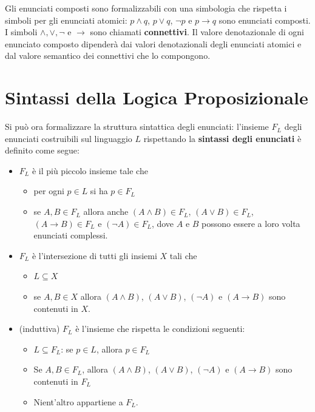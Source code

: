 Gli enunciati composti sono formalizzabili con una simbologia che rispetta 
i simboli per gli enunciati atomici: $p \land q$, $p \lor q$, $\neg p$ e 
$p \rightarrow q$ sono enunciati composti. I simboli $\land, \lor, \neg$ 
e $\rightarrow$ sono chiamati \textbf{connettivi}. Il valore denotazionale 
di ogni enunciato composto dipenderà dai 
valori denotazionali degli enunciati atomici e dal valore semantico dei connettivi 
che lo compongono. 

\section{Sintassi della Logica Proposizionale}
Si può ora formalizzare la struttura sintattica degli enunciati: 
l'insieme $F_{L}$ degli enunciati costruibili 
sul linguaggio $L$ rispettando la \textbf{sintassi 
degli enunciati} è definito come segue: 
\begin{itemize}
  \setlength\itemsep{0pt}
 \item $F_L$ è il più piccolo insieme tale che 
    \begin{itemize}
      \item per ogni $p \in L$ si ha $p \in F_L$
      \item se $A,B \in F_L$ allora anche $(A\land B) \in F_L$, $(A\lor B) \in F_L$, 
        $(A \rightarrow B) \in F_L$ e $(\neg A) \in F_L$, dove $A$ e $B$ possono 
        essere a loro volta enunciati complessi. 
      \end{itemize}
  \item $F_L$ è l'intersezione di tutti gli insiemi $X$ tali che 
    \begin{itemize}
      \item $L \subseteq X$
      \item se $A,B \in X$ allora $(A\land B)$, $(A\lor B)$, $(\neg A)$ e 
        $(A \rightarrow B)$ sono contenuti in $X$. 
    \end{itemize}
  \item (induttiva) $F_L$ è l'insieme che rispetta le condizioni seguenti: 
    \begin{itemize}
      \item $L \subseteq F_L$: se $p \in L$, allora $p \in F_L$
      \item Se $A,B \in F_L$, allora $(A\land B)$, $(A\lor B)$, $(\neg A)$ e 
        $(A \rightarrow B)$ sono contenuti in $F_L$
      \item Nient'altro appartiene a $F_L$.
    \end{itemize}
\end{itemize}

